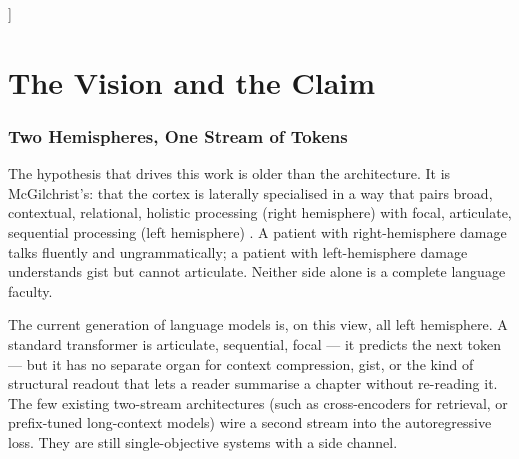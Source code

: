 \documentclass[10pt, twocolumn, a4paper]{article}
\begin{document}
\begin{abstract}
\textbf{Biological and structural motivation.} The two-hemisphere framing is not decoration: McGilchrist's right-hemisphere supplies contextual framing rather than articulate output, hippocampal place cells encode position as phase on a shared theta oscillator (the same primitive RoPE uses), and the HRR / VSA literature (Plate 1995; Kanerva 2009) gives unitary rotation as a binding operator with provable invertibility. These are the reasons we expect a rotational gauge supplied by a streaming observer to be the right shape of object for L to consume. They are not the deliverables; the deliverables are the two engineering outcomes above.

\textbf{Pass / fail commitments.} (a) NTP loss of $L+R$ within $\varepsilon$ of matched-compute $L$-alone at training $T$. (b) $L+R$ loss-vs-$T_{\text{eval}}$ curve degrades less steeply than $L$-alone's. (c) A single inference-time intervention on R produces a measurable, predictable shift in L's continuation probabilities. We commit to reporting all three in the same paper, with the architecture and experimental queue oriented entirely toward producing them.
\end{abstract}\vspace{0.5cm}]


\part{The Vision and the Claim}

\section{Two Hemispheres, One Stream of Tokens}
\label{sec:two_hemispheres}

The hypothesis that drives this work is older than the architecture. It is McGilchrist's: that the cortex is laterally specialised in a way that pairs broad, contextual, relational, holistic processing (right hemisphere) with focal, articulate, sequential processing (left hemisphere) \cite{mcgilchrist2009master, mcgilchrist2021matter}. A patient with right-hemisphere damage talks fluently and ungrammatically; a patient with left-hemisphere damage understands gist but cannot articulate. Neither side alone is a complete language faculty.

The current generation of language models is, on this view, all left hemisphere. A standard transformer is articulate, sequential, focal --- it predicts the next token --- but it has no separate organ for context compression, gist, or the kind of structural readout that lets a reader summarise a chapter without re-reading it. The few existing two-stream architectures (such as cross-encoders for retrieval, or prefix-tuned long-context models) wire a second stream into the autoregressive loss. They are still single-objective systems with a side channel.
\end{document}
